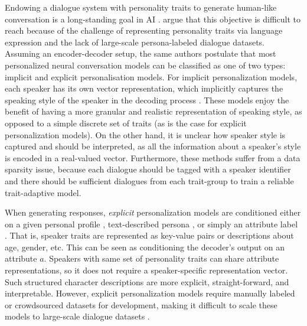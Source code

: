 Endowing a dialogue system with personality traits to generate human-like conversation is a long-standing goal in AI \citep{edlund2008towards, scheutz2011toward, madotto-etal-2020-plug}. \cite{zheng2019personalized} argue that this objective is difficult to reach because of the challenge of representing personality traits via language expression and the lack of large-scale persona-labeled dialogue datasets. Assuming an encoder-decoder setup, the same authors postulate that most personalized neural conversation models can be classified as one of two types: implicit and explicit personalisation models. For implicit personalization models, each speaker has its own vector representation, which implicitly captures the speaking style of the speaker in the decoding process \citep{ijcai2017-521, li-etal-2016-persona}. These models enjoy the benefit of having a more granular and realistic representation of speaking style, as opposed to a simple discrete set of traits (as is the case for explicit personalization models). On the other hand, it is unclear how speaker style is captured and should be interpreted, as all the information about a speaker's style is encoded in a real-valued vector. Furthermore, these methods suffer from a data sparsity issue, because each dialogue should be tagged with a speaker identifier and there should be sufficient dialogues from each trait-group to train a reliable trait-adaptive model. 

When generating responses, \textit{explicit} personalization models are conditioned either on a given personal profile \citep{ijcai2018-595}, text-described persona \citep{zhang-etal-2018-personalizing}, or simply an attribute label \citep{madotto-etal-2020-plug}. That is, speaker traits are represented as key-value pairs or descriptions about age, gender, etc. This can be seen as conditioning the decoder's output on an attribute $a$. Speakers with same set of personality traits can share attribute representations, so it does not require a speaker-specific representation vector. Such structured character descriptions are more explicit, straight-forward, and interpretable. However, explicit personalization models require manually labeled or crowdsourced datasets for development, making it difficult to scale these models to large-scale dialogue datasets \cite{zheng2019personalized, madotto-etal-2020-plug}.

